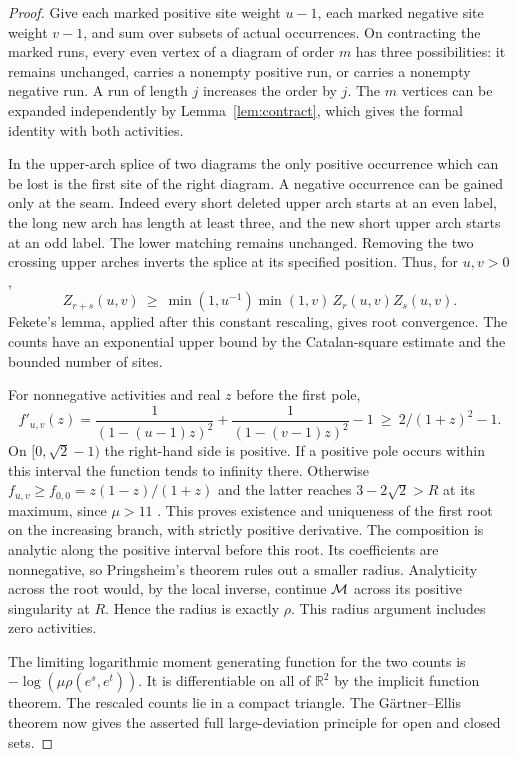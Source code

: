 \begin{proof}
Give each marked positive site weight \(u-1\), each marked negative
site weight \(v-1\), and sum over subsets of actual occurrences.
On contracting the marked runs, every even vertex of a diagram of
order \(m\) has three possibilities: it remains unchanged, carries a
nonempty positive run, or carries a nonempty negative run. A run of
length \(j\) increases the order by \(j\). The \(m\) vertices can be
expanded independently by Lemma~\ref{lem:contract}, which gives the
formal identity with both activities.

In the upper-arch splice of two diagrams the only positive occurrence
which can be lost is the first site of the right diagram. A negative
occurrence can be gained only at the seam. Indeed every short deleted
upper arch starts at an even label, the long new arch has length at
least three, and the new short upper arch starts at an odd label.
The lower matching remains unchanged. Removing the two crossing upper
arches inverts the splice at its specified position. Thus, for
\(u,v>0\),
\[
 Z_{r+s}(u,v)\ \geq\ \min(1,u^{-1})\min(1,v)\,Z_r(u,v)Z_s(u,v).
\]
Fekete's lemma, applied after this constant rescaling, gives root
convergence. The counts have an exponential upper bound by the
Catalan-square estimate and the bounded number of sites.

For nonnegative activities and real \(z\) before the first pole,
\[
 f'_{u,v}(z)=\frac1{(1-(u-1)z)^2}+\frac1{(1-(v-1)z)^2}-1
             \ \geq\ 2/(1+z)^2-1.
\]
On \([0,\sqrt2-1)\) the right-hand side is positive. If a positive pole
occurs within this interval the function tends to infinity there.
Otherwise \(f_{u,v}\ge f_{0,0}=z(1-z)/(1+z)\) and the latter reaches
\(3-2\sqrt2>R\) at its maximum, since \(\mu>11\) \cite{AP}. This proves
existence and uniqueness of the first root on the increasing branch,
with strictly positive derivative. The composition is analytic along
the positive interval before this root. Its coefficients are
nonnegative, so Pringsheim's theorem rules out a smaller radius.
Analyticity across the root would, by the local inverse, continue
\(\mathcal M\) across its positive singularity at \(R\). Hence the radius is
exactly \(\rho\). This radius argument includes zero activities.

The limiting logarithmic moment generating function for the two
counts is \(-\log(\mu\rho(e^s,e^t))\). It is differentiable on all of
\(\mathbb R^2\) by the implicit function theorem. The rescaled counts
lie in a compact triangle. The G\"artner--Ellis theorem
\cite[Theorem 2.3.6]{DZ} now gives the asserted full large-deviation
principle for open and closed sets.
\end{proof}

